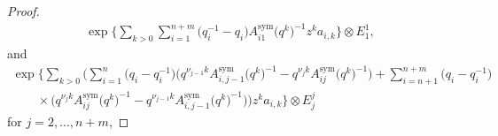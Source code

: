 \documentclass[10pt,a4paper]{amsart}
\numberwithin{equation}{section}
\begin{document}
\begin{proof}
\begin{gather}\label{Ai-1}
 \exp\Biggl\{\sum\limits_{k>0}\sum\limits_{i=1}^{n+m}\bigl(q_i^{-1}-q_i\bigr)
 A_{i1}^{\operatorname{sym}}\bigl(q^k\bigr)^{-1} z^k
 a_{i,k}\Biggr\}\otimes E^1_1,
\end{gather}
and
\begin{gather}
 \exp\Biggl\{\sum\limits_{k>0}\Biggl(\sum\limits_{i=1}^{n}\bigl(q_i-q_i^{-1}\bigr)
 \bigl(q^{\nu_{j-1}k}A_{i,j-1}^{\operatorname{sym}}\bigl(q^k\bigr)^{-1}-q^{\nu_jk}A_{ij}^{\operatorname{sym}}\bigl(q^k\bigr)^{-1}\bigr)+ \sum\limits_{i=n+1}^{n+m}\bigl(q_i-q_i^{-1}\bigr)\nonumber\\
 \qquad\times \bigl(q^{\nu_jk}A_{ij}^{\operatorname{sym}}\bigl(q^k\bigr)^{-1}-q^{\nu_{j-1}k}A_{i,j-1}^{\operatorname{sym}}\bigl(q^k\bigr)^{-1}\bigr)\bigr) z^k
 a_{i,k}\bigr\}\otimes E^j_j\label{Aij}
\end{gather}
for $j=2,\dots,n+m$,


\end{proof}
\end{document}
